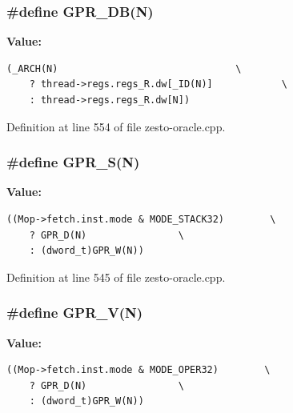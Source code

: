 \subsubsection[{GPR\_\-DB}]{\setlength{\rightskip}{0pt plus 5cm}\#define GPR\_\-DB(N)}\label{zesto-oracle_8cpp_df3fe7e9d48738a5f50cdcf7267799f7}


\textbf{Value:}

\begin{Code}\begin{verbatim}(_ARCH(N)                               \
    ? thread->regs.regs_R.dw[_ID(N)]            \
    : thread->regs.regs_R.dw[N])
\end{verbatim}
\end{Code}


Definition at line 554 of file zesto-oracle.cpp.
\subsubsection[{GPR\_\-S}]{\setlength{\rightskip}{0pt plus 5cm}\#define GPR\_\-S(N)}\label{zesto-oracle_8cpp_7533b70fb575778a0b20811f5a9c8bb4}


\textbf{Value:}

\begin{Code}\begin{verbatim}((Mop->fetch.inst.mode & MODE_STACK32)        \
    ? GPR_D(N)                \
    : (dword_t)GPR_W(N))
\end{verbatim}
\end{Code}


Definition at line 545 of file zesto-oracle.cpp.
\subsubsection[{GPR\_\-V}]{\setlength{\rightskip}{0pt plus 5cm}\#define GPR\_\-V(N)}\label{zesto-oracle_8cpp_643f69abe43c44c53ccb513dc75b8edd}


\textbf{Value:}

\begin{Code}\begin{verbatim}((Mop->fetch.inst.mode & MODE_OPER32)        \
    ? GPR_D(N)                \
    : (dword_t)GPR_W(N))
\end{verbatim}
\end{Code}


